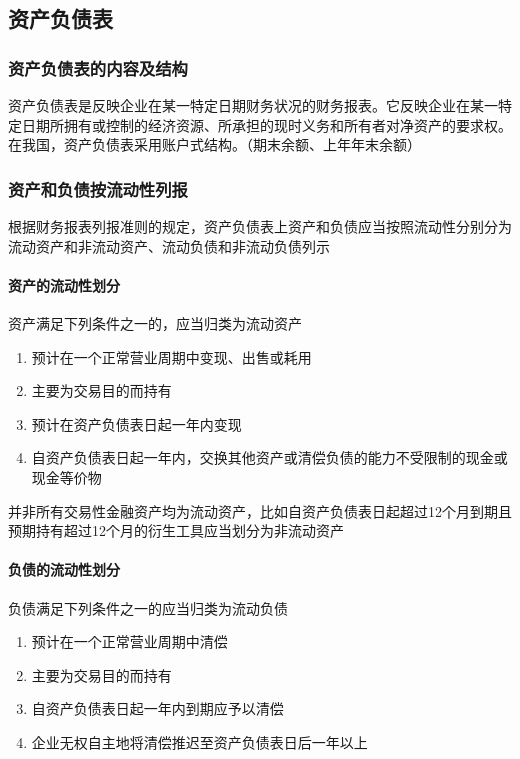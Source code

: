 \documentclass[UTF8,12pt]{ctexart}
\numberwithin{equation}{section} %
\numberwithin{figure}{section}
\numberwithin{table}{section}
\begin{document}
	\subsection{资产负债表}
	\subsubsection{资产负债表的内容及结构}
	资产负债表是反映企业在某一特定日期财务状况的财务报表。它反映企业在某一特定日期所拥有或控制的经济资源、所承担的现时义务和所有者对净资产的要求权。在我国，资产负债表采用账户式结构。（期末余额、上年年末余额）
	
	\subsubsection{资产和负债按流动性列报}
	根据财务报表列报准则的规定，资产负债表上资产和负债应当按照流动性分别分为流动资产和非流动资产、流动负债和非流动负债列示
	\paragraph{资产的流动性划分}
	资产满足下列条件之一的，应当归类为流动资产
	\begin{enumerate}
		\item 预计在一个正常营业周期中变现、出售或耗用
		
		\item 主要为交易目的而持有
		
		\item 预计在资产负债表日起一年内变现
		
		\item 自资产负债表日起一年内，交换其他资产或清偿负债的能力不受限制的现金或现金等价物
	\end{enumerate}
	
	并非所有交易性金融资产均为流动资产，比如自资产负债表日起超过12个月到期且预期持有超过12个月的衍生工具应当划分为非流动资产
	
	\paragraph{负债的流动性划分}
	负债满足下列条件之一的应当归类为流动负债
	\begin{enumerate}
		\item 预计在一个正常营业周期中清偿
		
		\item 主要为交易目的而持有
		
		\item 自资产负债表日起一年内到期应予以清偿
		
		\item 企业无权自主地将清偿推迟至资产负债表日后一年以上
	\end{enumerate}
	
\end{document}
